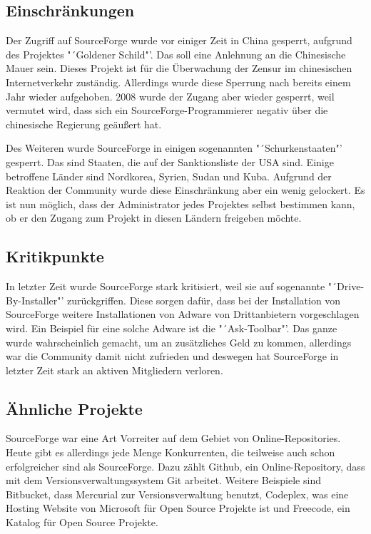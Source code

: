 \subsection{Einschr\"ankungen}
Der Zugriff auf SourceForge wurde vor einiger Zeit in China gesperrt, aufgrund des Projektes "´Goldener Schild"'. Das soll eine Anlehnung an die Chinesische Mauer sein. Dieses Projekt ist f\"ur die \"Uberwachung der Zensur im chinesischen Internetverkehr zust\"andig. Allerdings wurde diese Sperrung nach bereits einem Jahr wieder aufgehoben. 2008 wurde der Zugang aber wieder gesperrt, weil vermutet wird, dass sich ein SourceForge-Programmierer negativ \"uber die chinesische Regierung ge\"au{\ss}ert hat. 

Des Weiteren wurde SourceForge in einigen sogenannten "´Schurkenstaaten"' gesperrt. Das sind Staaten, die auf der Sanktionsliste der USA sind. Einige betroffene Länder sind Nordkorea, Syrien, Sudan und Kuba. Aufgrund der Reaktion der Community wurde diese Einschränkung aber ein wenig gelockert. Es ist nun möglich, dass der Administrator jedes Projektes selbst bestimmen kann, ob er den Zugang zum Projekt in diesen Ländern freigeben möchte. 

\subsection{Kritikpunkte}
In letzter Zeit wurde SourceForge stark kritisiert, weil sie auf sogenannte "´Drive-By-Installer"' zurückgriffen. Diese sorgen daf\"ur, dass bei der Installation von SourceForge weitere Installationen von Adware von Drittanbietern vorgeschlagen wird. Ein Beispiel für eine solche Adware ist die "´Ask-Toolbar"'. Das ganze wurde wahrscheinlich gemacht, um an zus\"atzliches Geld zu kommen, allerdings war die Community damit nicht zufrieden und deswegen hat SourceForge in letzter Zeit stark an aktiven Mitgliedern verloren. 

\subsection{\"Ahnliche Projekte}

SourceForge war eine Art Vorreiter auf dem Gebiet von Online-Repositories. Heute gibt es allerdings jede Menge Konkurrenten, die teilweise auch schon erfolgreicher sind als SourceForge. Dazu zählt Github, ein Online-Repository, dass mit dem Versionsverwaltungssystem Git arbeitet. Weitere Beispiele sind Bitbucket, dass Mercurial zur Versionsverwaltung benutzt, Codeplex, was eine Hosting Website von Microsoft für Open Source Projekte ist und Freecode, ein Katalog für Open Source Projekte.



